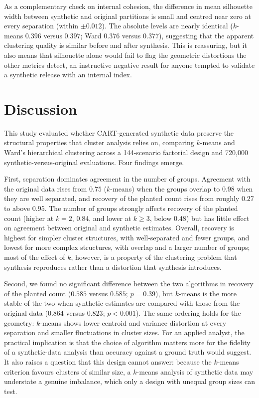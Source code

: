 \documentclass[pdflatex,sn-basic]{sn-jnl}
\begin{document}
As a complementary check on internal cohesion, the difference in mean
silhouette width between synthetic and original partitions is small and
centred near zero at every separation (within $\pm 0.012$). The absolute
levels are nearly identical ($k$-means $0.396$ versus $0.397$; Ward $0.376$
versus $0.377$), suggesting that the apparent clustering quality is similar
before and after synthesis. This is reassuring, but it also means that
silhouette alone would fail to flag the geometric distortions the other
metrics detect, an instructive negative result for anyone tempted to validate
a synthetic release with an internal index.

\section{Discussion}

This study evaluated whether CART-generated synthetic data preserve the
structural properties that cluster analysis relies on, comparing $k$-means and
Ward's hierarchical clustering across a 144-scenario factorial design and
720{,}000 synthetic-versus-original evaluations. Four findings emerge.

First, separation dominates agreement in the number of groups. Agreement with
the original data rises from $0.75$ ($k$-means) when the groups overlap to
$0.98$ when they are well separated, and recovery of the planted count rises
from roughly $0.27$ to above $0.95$. The number of groups strongly affects
recovery of the planted count (higher at $k = 2$, $0.84$, and lower at
$k \ge 3$, below $0.48$) but has little effect on agreement between original
and synthetic estimates. Overall, recovery is highest for simpler cluster
structures, with well-separated and fewer groups, and lowest for more complex
structures, with overlap and a larger number of groups; most of the effect of
$k$, however, is a property of the clustering problem that synthesis
reproduces rather than a distortion that synthesis introduces.

Second, we found no significant difference between the two algorithms in
recovery of the planted count ($0.585$ versus $0.585$; $p = 0.39$), but
$k$-means is the more stable of the two when synthetic estimates are compared
with those from the original data ($0.864$ versus $0.823$; $p < 0.001$). The
same ordering holds for the geometry: $k$-means shows lower centroid and
variance distortion at every separation and smaller fluctuations in cluster
sizes. For an applied analyst, the practical implication is that the choice of
algorithm matters more for the fidelity of a synthetic-data analysis than
accuracy against a ground truth would suggest. It also raises a question that
this design cannot answer: because the $k$-means criterion favours clusters of
similar size, a $k$-means analysis of synthetic data may understate a genuine
imbalance, which only a design with unequal group sizes can test.
\end{document}

